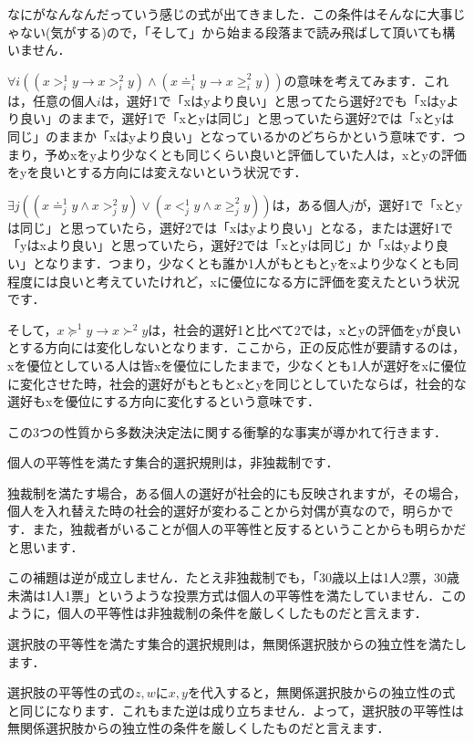 なにがなんなんだっていう感じの式が出てきました．この条件はそんなに大事じゃない(気がする)ので，「そして」から始まる段落まで読み飛ばして頂いても構いません．

$\forall i ((x >^1_i y \to x >^2_i y) \land (x \doteq^1_i y \to x \geq^2_i y))$の意味を考えてみます．これは，任意の個人$i$は，選好1で「xはyより良い」と思ってたら選好2でも「xはyより良い」のままで，選好1で「xとyは同じ」と思っていたら選好2では「xとyは同じ」のままか「xはyより良い」となっているかのどちらかという意味です．つまり，予めxをyより少なくとも同じくらい良いと評価していた人は，xとyの評価をyを良いとする方向には変えないという状況です．

$\exists j ((x \doteq^1_j y \land x >^2_j y) \lor (x <^1_j y \land x \geq^2_j y))$は，ある個人$j$が，選好1で「xとyは同じ」と思っていたら，選好2では「xはyより良い」となる，または選好1で「yはxより良い」と思っていたら，選好2では「xとyは同じ」か「xはyより良い」となります．つまり，少なくとも誰か1人がもともとyをxより少なくとも同程度には良いと考えていたけれど，xに優位になる方に評価を変えたという状況です．

そして，$x \succeq^1 y \to x \succ^2 y$は，社会的選好1と比べて2では，xとyの評価をyが良いとする方向には変化しないとなります．ここから，正の反応性が要請するのは，xを優位としている人は皆xを優位にしたままで，少なくとも1人が選好をxに優位に変化させた時，社会的選好がもともとxとyを同じとしていたならば，社会的な選好もxを優位にする方向に変化するという意味です．

この3つの性質から多数決決定法に関する衝撃的な事実が導かれて行きます．

\begin{lem}
    個人の平等性を満たす集合的選択規則は，非独裁制です．
\end{lem}

独裁制を満たす場合，ある個人の選好が社会的にも反映されますが，その場合，個人を入れ替えた時の社会的選好が変わることから対偶が真なので，明らかです．また，独裁者がいることが個人の平等性と反するということからも明らかだと思います．

この補題は逆が成立しません．たとえ非独裁制でも，「30歳以上は1人2票，30歳未満は1人1票」というような投票方式は個人の平等性を満たしていません．このように，個人の平等性は非独裁制の条件を厳しくしたものだと言えます．

\begin{lem}
    選択肢の平等性を満たす集合的選択規則は，無関係選択肢からの独立性を満たします．
\end{lem}

選択肢の平等性の式の$z,w$に$x,y$を代入すると，無関係選択肢からの独立性の式と同じになります．これもまた逆は成り立ちません．よって，選択肢の平等性は無関係選択肢からの独立性の条件を厳しくしたものだと言えます．

